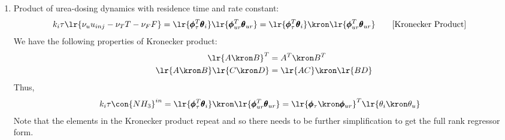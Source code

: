 \begin{enumerate}
        \item Product of urea-dosing dynamics with residence time and rate constant:
        \begin{align*}
        k_{i} \tau \lr{\nu_u u_{inj} - \nu_T T - \nu_F F} &= \lr{\pmb \phi^T_\tau \pmb \theta_i} \lr{\pmb \phi^T_{ur} \pmb \theta_{ur}} = \lr{\pmb \phi^T_\tau \pmb \theta_i} \kron \lr{\pmb \phi^T_{ur} \pmb \theta_{ur}}
        \qquad [\text{Kronecker Product}]
        \end{align*}
        We have the following properties of Kronecker product:
        \begin{align*}
                \lr{A \kron B}^T &= A^T \kron B^T \\
                \lr{A \kron B} \lr{C \kron D} &= \lr{AC} \kron \lr{BD}
        \end{align*}
        Thus,
        \begin{align*}
                k_{i} \tau \con{NH_3}^{in} &= \lr{\pmb \phi^T_\tau \pmb \theta_i} \kron \lr{\pmb \phi^T_{ur} \pmb \theta_{ur}}
                = \lr{\pmb \phi_\tau \kron \pmb \phi_{ur}}^T \lr{\theta_i \kron \theta_u}
        \end{align*}
        Note that the elements in the Kronecker product repeat and so there needs to be further simplification to get the full rank regressor form.
\end{enumerate}
